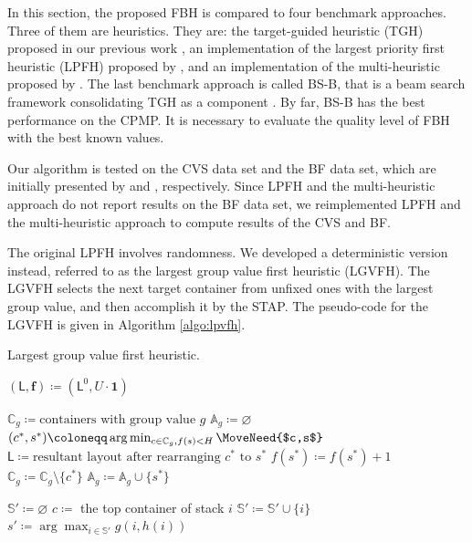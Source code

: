 \documentclass[review,3p,times,12pt,number]{elsarticle}\usepackage{amsmath}\usepackage{amssymb}
\renewcommand{\citet}[1]{\citeauthor{#1} \citep{#1}}
\renewcommand{\gets}{\coloneqq}
\newcommand{\setalgo}{\linespread{1}\fontsize{10}{12}\selectfont}
\begin{document}
In this section, the proposed FBH is compared to four benchmark approaches. Three of them are heuristics. They are: the target-guided heuristic (TGH) proposed in our previous work \citep{wang2015}, an implementation of the largest priority first heuristic (LPFH) proposed by \citet{exp2012}, and an implementation of the multi-heuristic proposed by \citet{jovanovic2014}. The last benchmark approach is called BS-B, that is a beam search framework consolidating TGH as a component \citep{wang2015}. By far, BS-B has the best performance on the CPMP\@. It is necessary to evaluate the quality level of FBH with the best known values.

Our algorithm is tested on the CVS data set and the BF data set, which are initially presented by \citet{cas2011} and \citet{bort2012}, respectively.
Since LPFH and the multi-heuristic approach do not report results on the BF data set, we reimplemented LPFH and the multi-heuristic approach to compute results of the CVS and BF.

The original LPFH involves randomness. We developed a deterministic version instead, referred to as the largest group value first heuristic (LGVFH). The LGVFH selects the next target container from unfixed ones with the largest group value, and then accomplish it by the STAP\@. The pseudo-code for the LGVFH is given in Algorithm \ref{algo:lpvfh}.

\begin{algorithm*}[htbp]
\caption{Largest group value first heuristic.}
\label{algo:lpvfh}


\setalgo


\Begin
{
  $(\mathsf{L},\boldsymbol{f})\gets (\mathsf{L}^0,U\cdot\boldsymbol{1})$\;

  {
    $\mathbb{C}_g\gets\textrm{containers with group value $g$}$\;
    $\mathbb{A}_g\gets\varnothing$
    {
      $(c^*, s^*)\gets \arg\min_{c\in\mathbb{C}_g, f(s)<H} \MoveNeed{$c,s$}$\;
      $\mathsf{L} \gets \textrm{resultant layout after rearranging $c^*$ to $s^*$}$\;
      $f(s^*)\gets f(s^*)+1$\;
      $\mathbb{C}_g\gets\mathbb{C}_g\setminus\{c^*\}$\;
      $\mathbb{A}_g\gets \mathbb{A}_g\cup \{s^*\}$\;
    }
    {
    	\;
    }
  }
}



{%
  {
    $\mathbb{S}'\gets\varnothing$\;
    {
      $c\gets$ the top container of stack $i$\;
      {
        $\mathbb{S}'\gets \mathbb{S}'\cup \{i\}$\;
      }
    }
    {
      $s'\gets \arg\max_{i\in\mathbb{S}'} g(i,h(i))$\;
      \;
    }
    {
      \Break\;
    }
  }
}


\end{algorithm*}
\end{document}
